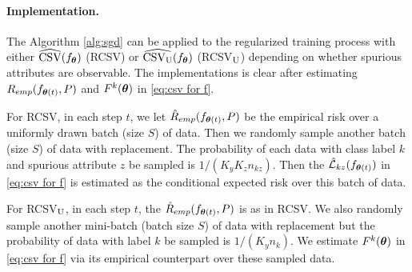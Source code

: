 \documentclass{article} %
\newcommand{\btheta}{\text{\boldmath{$\theta$}}}
\newcommand{\bF}{\boldsymbol{F}}
\newcommand{\cL}{\mathcal{L}}
\begin{document}
	\paragraph{Implementation.} The Algorithm \ref{alg:sgd} can be applied to the regularized training process with either $\widehat{\rm CSV}(f_{\btheta})$ (RCSV) or $\widehat{\rm CSV_{U}}(f_{\btheta})$ (RCSV$_{\rm U}$) depending on whether spurious attributes are observable. The implementations is clear after estimating $R_{emp}(f_{\btheta(t)}, P)$ and $F^{k}(\btheta)$ in \eqref{eq:csv for f}.
	\par
	For RCSV, in each step $t$, we let $\hat{R}_{emp}(f_{\btheta(t)}, P)$ be the empirical risk over a uniformly drawn batch (size $S$) of data. Then we randomly sample another batch (size $S$) of data with replacement. The probability of each data with class label $k$ and spurious attribute $z$ be sampled is $1 / (K_{y}K_{z}n_{kz})$. Then the $\hat{\cL}_{kz}(f_{\btheta(t)})$ in \eqref{eq:csv for f} is estimated as the conditional expected risk over this batch of data. 
	\par
	For RCSV$_{\rm U}$, in each step $t$, the $\hat{R}_{emp}(f_{\btheta(t)}, P)$ is as in RCSV. We also randomly sample another mini-batch (batch size $S$) of data with replacement but the probability of data with label $k$ be sampled is $1 / (K_{y}n_{k})$. We estimate $F^{k}(\btheta)$ in \eqref{eq:csv for f} via its empirical counterpart over these sampled data. 
\end{document}
